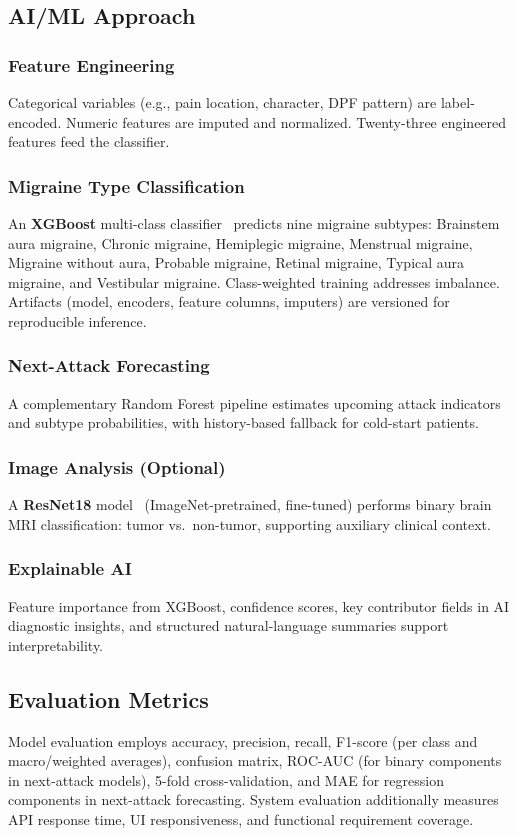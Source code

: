 \documentclass[conference,twocolumn,letterpaper]{IEEEtran}
\begin{document}
\subsection{AI/ML Approach}

\subsubsection{Feature Engineering}
Categorical variables (e.g., pain location, character, DPF pattern) are label-encoded. Numeric features are imputed and normalized. Twenty-three engineered features feed the classifier.

\subsubsection{Migraine Type Classification}
An \textbf{XGBoost} multi-class classifier~\cite{chen2016} predicts nine migraine subtypes: Brainstem aura migraine, Chronic migraine, Hemiplegic migraine, Menstrual migraine, Migraine without aura, Probable migraine, Retinal migraine, Typical aura migraine, and Vestibular migraine. Class-weighted training addresses imbalance. Artifacts (model, encoders, feature columns, imputers) are versioned for reproducible inference.

\subsubsection{Next-Attack Forecasting}
A complementary Random Forest pipeline estimates upcoming attack indicators and subtype probabilities, with history-based fallback for cold-start patients.

\subsubsection{Image Analysis (Optional)}
A \textbf{ResNet18} model~\cite{he2016} (ImageNet-pretrained, fine-tuned) performs binary brain MRI classification: tumor vs.\ non-tumor, supporting auxiliary clinical context.

\subsubsection{Explainable AI}
Feature importance from XGBoost, confidence scores, key contributor fields in AI diagnostic insights, and structured natural-language summaries support interpretability.

\subsection{Evaluation Metrics}
Model evaluation employs accuracy, precision, recall, F1-score (per class and macro/weighted averages), confusion matrix, ROC-AUC (for binary components in next-attack models), 5-fold cross-validation, and MAE for regression components in next-attack forecasting. System evaluation additionally measures API response time, UI responsiveness, and functional requirement coverage.
\end{document}

